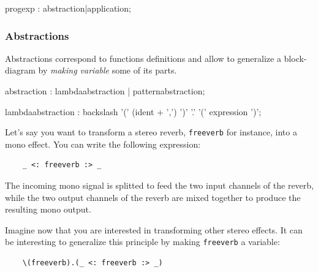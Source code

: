 \begin{rail}
progexp : abstraction|application;
\end{rail}   
 
\subsubsection{Abstractions}

Abstractions correspond to functions definitions and allow to generalize a block-diagram by \textit{making variable} some of its parts. 

% 

\begin{rail}
abstraction : lambdaabstraction | patternabstraction; 
\end{rail}

\begin{rail}
lambdaabstraction :  backslash '(' (ident + ',') ')' '.' '(' expression ')';
\end{rail}

Let's say you want to transform a stereo reverb, \lstinline'freeverb' for instance, into a mono effect. You can write the following expression: 
\begin{lstlisting}
	_ <: freeverb :> _ 
\end{lstlisting}
The incoming mono signal is splitted to feed the two input channels of the reverb, while the two output channels of the reverb are mixed together to produce the resulting mono output.

Imagine now that you are interested in transforming other stereo effects. It can be interesting to generalize this principle by making \lstinline'freeverb' a variable: 
\begin{lstlisting}
	\(freeverb).(_ <: freeverb :> _)
\end{lstlisting}

